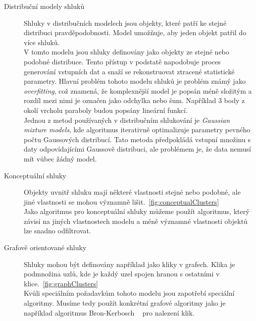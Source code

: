 \begin{description}
\item[Distribuční modely shluků] Shluky v distribučních modelech jsou objekty, které patří ke stejné distribuci pravděpodobnosti. Model umožňuje, aby jeden objekt patřil do více shluků. \\
V tomto modelu jsou shluky definovány jako objekty ze stejné nebo podobné distribuce. Tento přístup v podstatě napodobuje proces generování vstupních dat a snaží se rekonstruovat ztracené statistické parametry. Hlavní problém tohoto modelu shluků je problém známý jako \textit{overfitting}, což znamená, že komplexnější model je popsán méně složitým a rozdíl mezi nimi je označen jako odchylka nebo šum. Například 3 body z okolí vrcholu paraboly budou popsány lineární funkcí. \\
Jednou z metod používaných v distribučním shlukování je \textit {Gaussian mixture models}, kde algoritmus iterativně optimalizuje parametry pevného počtu Gaussových distribucí.
Tato metoda předpokládá vstupní množinu s daty odpovídajícími Gaussově distribuci, ale problémem je, že data nemusí mít vůbec žádný model.

\item[Konceptuální shluky] Objekty uvnitř shluku mají některé vlastnosti stejné nebo podobné, ale jiné vlastnosti se mohou významně lišit.~\autoref{fig:conceptualClusters} \\
Jako algoritmus pro konceptuální shluky můžeme použít algoritmus, který závisí na jiných vlastnostech modelu a méně významné vlastnosti objektů lze snadno odfiltrovat.

\item[Grafově orientované shluky] Shluky mohou být definovány například jako kliky v grafech. Klika je podmnožina uzlů, kde je každý uzel spojen hranou s ostatními v klice.~\autoref{fig:graphClusters} \\
Kvůli speciálním požadavkům tohoto modelu jsou zapotřebí speciální algoritmy. Musíme tedy použít konkrétní grafové algoritmy jako je například algoritmus Bron-Kerbosch ~\cite{Sun15} pro nalezení klik.
\end{description}

